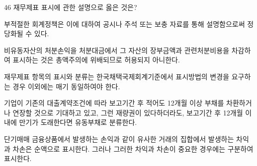 \begin{question}{46}
재무제표 표시에 관한 설명으로 옳은 것은?
\begin{choices}
  \item 부적절한 회계정책은 이에 대하여 공시나 주석 또는 보충 자료를 통해 설명함으로써 정당화될 수 있다.
  \item 비유동자산의 처분손익을 처분대금에서 그 자산의 장부금액과 관련처분비용을 차감하여 표시하는 것은 총액주의에 위배되므로 허용되지 아니한다.
  \item 재무제표 항목의 표시와 분류는 한국채택국제회계기준에서 표시방법의 변경을 요구하는 경우 이외에는 매기 동일하여야 한다.
  \item 기업이 기존의 대출계약조건에 따라 보고기간 후 적어도 12개월 이상 부채를 차환하거나 연장할 것으로 기대하고 있고, 그런 재량권이 있다하더라도, 보고기간 후 12개월 이내에 만기가 도래한다면 유동부채로 분류한다.
  \item 단기매매 금융상품에서 발생하는 손익과 같이 유사한 거래의 집합에서 발생하는 차익과 차손은 순액으로 표시한다. 그러나 그러한 차익과 차손이 중요한 경우에는 구분하여 표시한다.
\end{choices}
\end{question}
